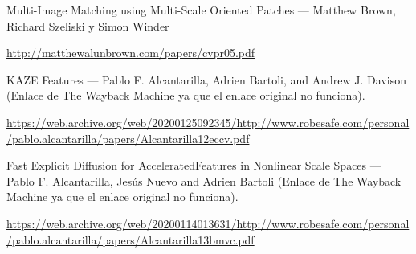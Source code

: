 \documentclass[12pt, spanish]{article}
\begin{document}
\begin{thebibliography}{9}


		Multi-Image Matching using Multi-Scale Oriented Patches --- Matthew Brown, Richard Szeliski y Simon Winder

		\url{http://matthewalunbrown.com/papers/cvpr05.pdf}


		KAZE Features --- Pablo F. Alcantarilla, Adrien Bartoli, and Andrew J. Davison (Enlace de The Wayback Machine ya que el enlace original no funciona).

		\url{https://web.archive.org/web/20200125092345/http://www.robesafe.com/personal/pablo.alcantarilla/papers/Alcantarilla12eccv.pdf}


		Fast Explicit Diffusion for AcceleratedFeatures in Nonlinear Scale Spaces --- Pablo F. Alcantarilla, Jesús Nuevo and Adrien Bartoli (Enlace de The Wayback Machine ya que el enlace original no funciona).

		\url{https://web.archive.org/web/20200114013631/http://www.robesafe.com/personal/pablo.alcantarilla/papers/Alcantarilla13bmvc.pdf}



\end{thebibliography}
\end{document}
